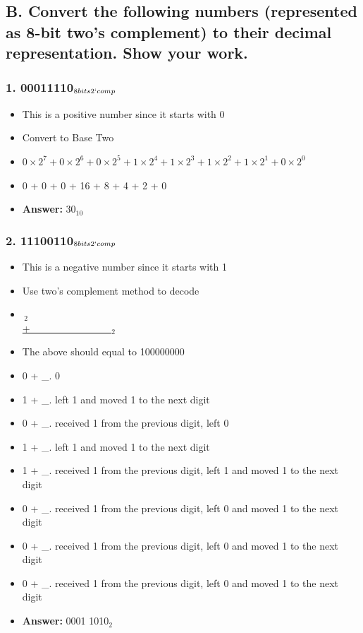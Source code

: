\documentclass[11pt, oneside]{article}
\begin{document}
\subsection*{B. Convert the following numbers (represented as 8-bit two’s complement) to their decimal representation. Show your work.}

\subsubsection*{1. 00011110$_{8 bits 2` comp}$}

\begin{itemize}
    \item This is a positive number since it starts with 0
    \item Convert to Base Two
    \item \(0\times2^7 + 0\times2^6 + 0\times2^5 + 1\times2^4 + 1\times2^3 + 1\times2^2 + 1\times2^1 + 0\times2^0\)
    \item 0 + 0 + 0 + 16 + 8 + 4 + 2 + 0
    \item \textbf{Answer:} 30$_{10}$
\end{itemize}

\pagebreak

\subsubsection*{2. 11100110$_{8 bits 2` comp}$}

\begin{itemize}
    \item This is a negative number since it starts with 1
    \item Use two’s complement method to decode
    \item \,\;$_{2}$ \\\underline{+\_\_\_\_\_\_\_\_\_\_\_$_{2}$}
    \item The above should equal to 100000000
    \item 0 + \_. 0
    \item 1 + \_. left 1 and moved 1 to the next digit
    \item 0 + \_. received 1 from the previous digit, left 0
    \item 1 + \_. left 1 and moved 1 to the next digit
    \item 1 + \_. received 1 from the previous digit, left 1 and moved 1 to the next digit
    \item 0 + \_. received 1 from the previous digit, left 0 and moved 1 to the next digit
    \item 0 + \_. received 1 from the previous digit, left 0 and moved 1 to the next digit
    \item 0 + \_. received 1 from the previous digit, left 0 and moved 1 to the next digit
    \item \textbf{Answer:} 0001 1010$_{2}$
\end{itemize}
\end{document}

